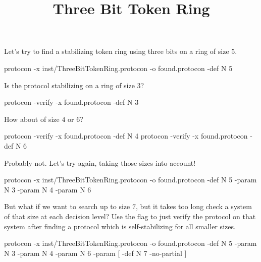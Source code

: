 
\title{Three Bit Token Ring}
\date{}


Let's try to find a stabilizing token ring using three bits on a ring of size $5$.
\begin{code}
protocon -x inst/ThreeBitTokenRing.protocon -o found.protocon -def N 5
\end{code}

Is the protocol stabilizing on a ring of size $3$?
\begin{code}
protocon -verify -x found.protocon -def N 3
\end{code}

How about of size $4$ or $6$?
\begin{code}
protocon -verify -x found.protocon -def N 4
protocon -verify -x found.protocon -def N 6
\end{code}

Probably not.
Let's try again, taking those sizes into account!
\begin{code}
protocon -x inst/ThreeBitTokenRing.protocon -o found.protocon -def N 5 -param N 3 -param N 4 -param N 6
\end{code}

But what if we want to search up to size $7$, but it takes too long check a system of that size at each decision level?
Use the  flag to just verify the protocol on that system after finding a protocol which is self-stabilizing for all smaller sizes.
\begin{code}
protocon -x inst/ThreeBitTokenRing.protocon -o found.protocon -def N 5 -param N 3 -param N 4 -param N 6 -param [ -def N 7 -no-partial ]
\end{code}



